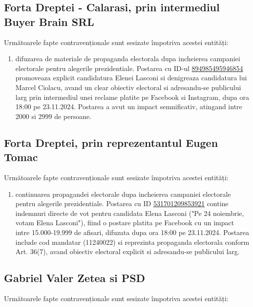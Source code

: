 \documentclass[a4paper,12pt]{article}
\begin{document}
\subsection{Forta Dreptei - Calarasi, prin intermediul Buyer Brain SRL}
Următoarele fapte contravenționale sunt sesizate împotriva acestei entități:

\begin{enumerate}[leftmargin=*, label=\arabic*.)]
    \item difuzarea de materiale de propaganda electorala dupa incheierea campaniei electorale pentru alegerile prezidentiale. Postarea cu ID-ul \href{https://www.facebook.com/ads/library/?id=894985495946854}{894985495946854} promoveaza explicit candidatura Elenei Lasconi si denigreaza candidatura lui Marcel Ciolacu, avand un clear obiectiv electoral si adresandu-se publicului larg prin intermediul unei reclame platite pe Facebook si Instagram, dupa ora 18:00 pe 23.11.2024. Postarea a avut un impact semnificativ, atingand intre 2000 si 2999 de persoane.
\end{enumerate}

\vspace{0.5cm}

\subsection{Forta Dreptei, prin reprezentantul Eugen Tomac}
Următoarele fapte contravenționale sunt sesizate împotriva acestei entități:

\begin{enumerate}[leftmargin=*, label=\arabic*.)]
    \item continuarea propagandei electorale dupa incheierea campaniei electorale pentru alegerile prezidentiale. Postarea cu ID \href{https://www.facebook.com/ads/library/?id=531701209853921}{531701209853921} contine indemnuri directe de vot pentru candidata Elena Lasconi ("Pe 24 noiembrie, votam Elena Lasconi"), fiind o postare platita pe Facebook cu un impact intre 15.000-19.999 de afisari, difuzata dupa ora 18:00 pe 23.11.2024. Postarea include cod mandatar (11240022) si reprezinta propaganda electorala conform Art. 36(7), avand obiectiv electoral explicit si adresandu-se publicului larg.
\end{enumerate}

\vspace{0.5cm}

\subsection{Gabriel Valer Zetea si PSD}
Următoarele fapte contravenționale sunt sesizate împotriva acestei entități:
\end{document}
